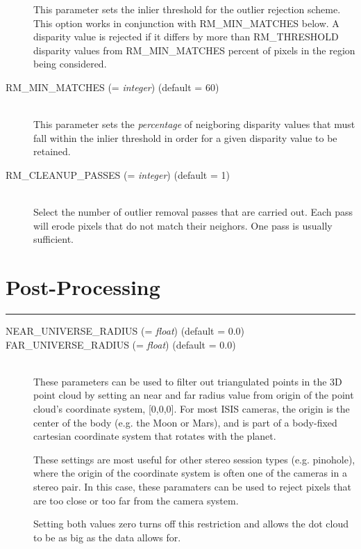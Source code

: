 \begin{description}
  This parameter sets the inlier threshold for the outlier rejection
  scheme.  This option works in conjunction with RM\_MIN\_MATCHES
  below.  A disparity value is rejected if it differs by more than
  RM\_THRESHOLD disparity values from RM\_MIN\_MATCHES percent of
  pixels in the region being considered.

\item[RM\_MIN\_MATCHES \textnormal{\small{(= \emph{integer})}} (default = 60)] \hfill \\

  This parameter sets the {\em percentage} of neigboring disparity
  values that must fall within the inlier threshold in order for a
  given disparity value to be retained.

\item[RM\_CLEANUP\_PASSES \textnormal{\small{(= \emph{integer})}} (default = 1)] \hfill \\

  Select the number of outlier removal passes that are carried out.
  Each pass will erode pixels that do not match their neighors.  One
  pass is usually sufficient.

\end{description}


\section{Post-Processing}
\hrule
\bigskip

\begin{description}
\item[NEAR\_UNIVERSE\_RADIUS \textnormal{\small{(= \emph{float})}} (default = 0.0)]
\item[FAR\_UNIVERSE\_RADIUS \textnormal{\small{(= \emph{float})}} (default = 0.0)] \hfill \\

  These parameters can be used to filter out triangulated points in
  the 3D point cloud by setting an near and far radius value from
  origin of the point cloud's coordinate system, [0,0,0].  For most
  ISIS cameras, the origin is the center of the body (e.g. the Moon or
  Mars), and is part of a body-fixed cartesian coordinate system that
  rotates with the planet.
  
  These settings are most useful for other stereo session types
  (e.g. pinohole), where the origin of the coordinate system is often
  one of the cameras in a stereo pair.  In this case, these paramaters
  can be used to reject pixels that are too close or too far from the
  camera system.

  Setting both values zero turns off this restriction and allows the
  dot cloud to be as big as the data allows for. 

\end{description}


